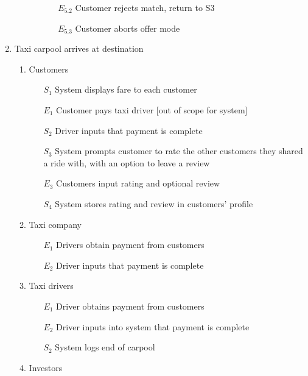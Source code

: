 \documentclass[]{article}
\begin{document}
\begin{enumerate}[{\textbf{BE}}1.]
\begin{enumerate}[{VP4}.1]
\begin{enumerate}
\begin{enumerate}
                \item[$E_{5.2}$] Customer rejects match, return to S3
                \item[$E_{5.3}$] Customer aborts offer mode
                 \end{enumerate}
            \end{enumerate}
    \end{enumerate}
    \item Taxi carpool arrives at destination
    \begin{enumerate}[{VP5}.1]
        \item Customers
            \begin{enumerate}
                \item[$S_1$] System displays fare to each customer
                \item[$E_1$] Customer pays taxi driver [out of scope for system]
		   \item[$S_2$] Driver inputs that payment is complete
                \item[$S_3$] System prompts customer to rate the other customers they shared a ride with, with an option to leave a review
                \item[$E_3$] Customers input rating and optional review
                \item[$S_4$] System stores rating and review in customers’ profile
            \end{enumerate}
        \item Taxi company
            \begin{enumerate}
                \item[$E_1$] Drivers obtain payment from customers
                \item[$E_2$] Driver inputs that payment is complete
            \end{enumerate}
        \item Taxi drivers
            \begin{enumerate}
                \item[$E_1$] Driver obtains payment from customers
                \item[$E_2$] Driver inputs into system that payment is complete
                \item[$S_2$] System logs end of carpool
            \end{enumerate}
        \item Investors
            \begin{enumerate}
		\color{blue}

\end{enumerate}
\end{enumerate}
\end{enumerate}
\end{document}
